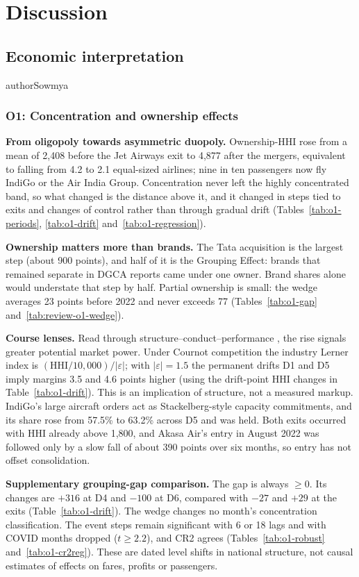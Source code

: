 \section{Discussion}
\label{sec:review-discussion}
\subsection{Economic interpretation}
\begin{mergedcontribution}{authorSowmya}
\subsubsection{O1: Concentration and ownership effects}
\textbf{From oligopoly towards asymmetric duopoly.} Ownership-HHI rose from a mean of 2,408 before the Jet Airways exit to 4,877 after the mergers, equivalent to falling from 4.2 to 2.1 equal-sized airlines; nine in ten passengers now fly IndiGo or the Air India Group. Concentration never left the highly concentrated band, so what changed is the distance above it, and it changed in steps tied to exits and changes of control rather than through gradual drift (Tables~\ref{tab:o1-periods}, \ref{tab:o1-drift} and~\ref{tab:o1-regression}).

\textbf{Ownership matters more than brands.} The Tata acquisition is the largest step (about 900 points), and half of it is the Grouping Effect: brands that remained separate in DGCA reports came under one owner. Brand shares alone would understate that step by half. Partial ownership is small: the wedge averages 23 points before 2022 and never exceeds 77 (Tables~\ref{tab:o1-gap} and~\ref{tab:review-o1-wedge}).

\textbf{Course lenses.} Read through structure--conduct--performance \parencite{gandhi2026marketstructure}, the rise signals greater potential market power. Under Cournot competition the industry Lerner index is $(\mathrm{HHI}/10{,}000)/|\varepsilon|$; with $|\varepsilon|=1.5$ the permanent drifts D1 and D5 imply margins 3.5 and 4.6 points higher (using the drift-point HHI changes in Table~\ref{tab:o1-drift}). This is an implication of structure, not a measured markup. IndiGo's large aircraft orders act as Stackelberg-style capacity commitments, and its share rose from 57.5\% to 63.2\% across D5 and was held. Both exits occurred with HHI already above 1,800, and Akasa Air's entry in August 2022 was followed only by a slow fall of about 390 points over six months, so entry has not offset consolidation.

\textbf{Supplementary grouping-gap comparison.} The gap is always $\geq0$. Its changes are $+316$ at D4 and $-100$ at D6, compared with $-27$ and $+29$ at the exits (Table~\ref{tab:o1-drift}). The wedge changes no month's concentration classification. The event steps remain significant with 6 or 18 lags and with COVID months dropped ($t\geq2.2$), and CR2 agrees (Tables~\ref{tab:o1-robust} and~\ref{tab:o1-cr2reg}). These are dated level shifts in national structure, not causal estimates of effects on fares, profits or passengers.
\end{mergedcontribution}

